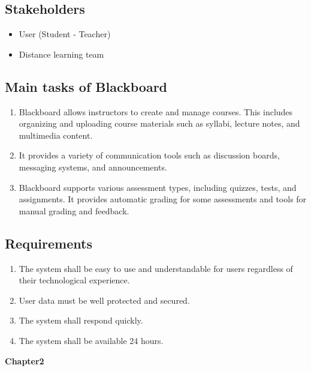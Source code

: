 \documentclass[12pt]{article}
\begin{document}
	\subsection{Stakeholders}
	\begin{itemize}
		\item User (Student - Teacher)
		\item Distance learning team
	\end{itemize}
	
	\subsection{Main tasks of Blackboard}
	\begin{enumerate}
		\item  Blackboard allows instructors to create and manage courses. This  	     includes organizing and uploading course materials such as syllabi, lecture notes, and multimedia content. 
		\item It provides a variety of communication tools such as discussion boards, messaging systems, and announcements.
		\item Blackboard supports various assessment types, including quizzes, tests, and assignments. It provides automatic grading for some assessments and tools for manual grading and feedback.
	\end{enumerate}
	
	\subsection{Requirements}
	\begin{enumerate}
		\item The system shall be easy to use and understandable for users regardless of their technological experience.
		\item User data must be well protected and secured.
		\item The system shall respond quickly.
		\item The system shall be available 24 hours.
	\end{enumerate}
	
	\newpage
		\begin{titlepage}		
		\centering
		\vspace*{1cm}
		\vfill
		
		\textbf{\Huge{Chapter2  } } \\
		
		
		\vfill
		
		\large
	\end{titlepage}
\end{document}
